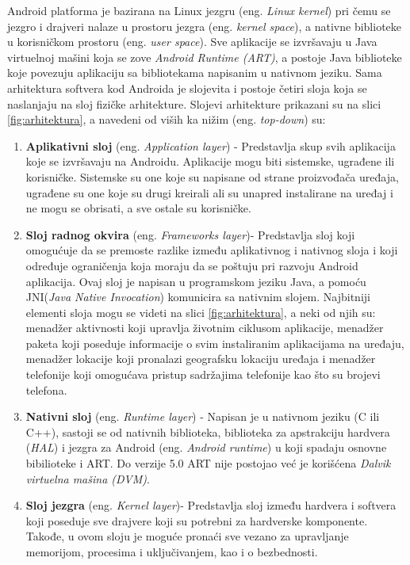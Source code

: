 \documentclass[android.tex]{subfiles}
\begin{document}
Android platforma je bazirana na Linux jezgru (eng. \textit{Linux kernel}) pri čemu se jezgro i drajveri nalaze u prostoru jezgra (eng. \textit{kernel space}), a nativne biblioteke u korisničkom prostoru (eng. \textit{user space}). Sve aplikacije se izvršavaju u Java virtuelnoj mašini koja se zove \textit{Android Runtime (ART)}, a postoje Java biblioteke koje povezuju aplikaciju sa bibliotekama napisanim u nativnom jeziku. Sama arhitektura softvera kod Androida je slojevita i postoje četiri sloja koja se naslanjaju na sloj fizičke arhitekture. Slojevi arhitekture prikazani su na slici \ref{fig:arhitektura}, a navedeni od viših ka nižim (eng. \textit{top-down}) su\cite{book:papp}:
\begin{enumerate}
\item \textbf{Aplikativni sloj} (eng. \textit{Application layer}) - Predstavlja skup svih aplikacija koje se izvršavaju na Androidu. Aplikacije mogu biti sistemske, ugrađene ili korisničke. Sistemske su one koje su napisane od strane proizvođača uređaja, ugrađene su one koje su drugi kreirali ali su unapred instalirane na uređaj i ne mogu se obrisati, a sve ostale su korisničke.
\item \textbf{Sloj radnog okvira} (eng. \textit{Frameworks layer})- Predstavlja sloj koji omogućuje da se premoste razlike između aplikativnog i nativnog sloja i koji određuje ograničenja koja moraju da se poštuju pri razvoju Android aplikacija. Ovaj sloj je napisan u programskom jeziku Java, a pomoću JNI(\textit{Java Native Invocation}) komunicira sa nativnim slojem. Najbitniji elementi sloja mogu se videti na slici \ref{fig:arhitektura}, a neki od njih su: menadžer aktivnosti koji upravlja životnim ciklusom aplikacije, menadžer paketa koji poseduje informacije o svim instaliranim aplikacijama na uređaju, menadžer lokacije koji pronalazi geografsku lokaciju uređaja i menadžer telefonije koji omogućava pristup sadržajima telefonije kao što su brojevi telefona. 
\item \textbf{Nativni sloj} (eng. \textit{Runtime layer}) - Napisan je u nativnom jeziku (C ili C++), sastoji se od nativnih biblioteka, biblioteka za apstrakciju hardvera (\textit{HAL}) i jezgra za Android (eng. \textit{Android runtime}) u koji spadaju osnovne bibilioteke i ART. Do verzije 5.0 ART nije postojao već je korišćena \textit{Dalvik virtuelna mašina (DVM)}.\cite{sajt:dalvik} 
\item \textbf{Sloj jezgra} (eng. \textit{Kernel layer})- Predstavlja sloj između hardvera i softvera koji poseduje sve drajvere koji su potrebni za hardverske komponente. Takođe, u ovom sloju je moguće pronaći sve vezano za upravljanje memorijom, procesima i uključivanjem, kao i o bezbednosti. 
\end{enumerate}
\end{document}
